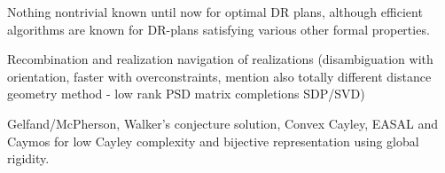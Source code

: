 Nothing nontrivial known until now for optimal DR plans, although efficient algorithms are known for DR-plans satisfying 
various other formal properties.

Recombination and realization navigation of realizations (disambiguation with orientation, faster with overconstraints, mention 
also totally different distance geometry method - low rank PSD matrix completions SDP/SVD)

Gelfand/McPherson, Walker's conjecture solution, Convex Cayley, EASAL and Caymos for low Cayley complexity and bijective 
representation using global rigidity.
